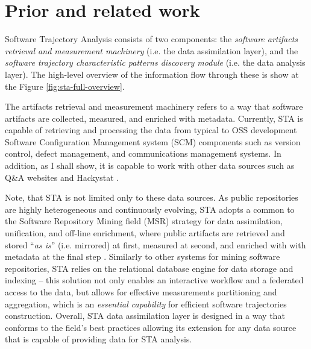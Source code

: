 \chapter{Prior and related work}\label{chapter_background_work}
Software Trajectory Analysis consists of two components: 
the \textit{software artifacts retrieval and measurement machinery} (i.e. the data assimilation layer), 
and the \textit{software trajectory characteristic patterns discovery module} (i.e. the data analysis layer). 
The high-level overview of the information flow through these is show at the Figure \ref{fig:sta-full-overview}.

The artifacts retrieval and measurement machinery refers to a way that software artifacts are collected, 
measured, and enriched with metadata. 
Currently, STA is capable of retrieving and processing the data from typical to OSS development Software 
Configuration Management system (SCM) components such as version control, 
defect management, and communications management systems. 
In addition, as I shall show, it is capable to work with other data sources such as Q\&A 
websites and Hackystat \cite{csdl2-10-09}.

Note, that STA is not limited only to these data sources.
As public repositories are highly heterogeneous and continuously evolving, STA adopts a common to the 
Software Repository Mining field (MSR) strategy for data assimilation, unification, and off-line enrichment,
where public artifacts are retrieved and stored ``\textit{as is}'' (i.e. mirrored) at first, 
measured at second, and enriched with with metadata at the final step 
\cite{citeulike:12550438} \cite{german04_softchange} \cite{cvsanaly}.
Similarly to other systems for mining software repositories, STA relies on the relational database engine 
for data storage and indexing -- this solution not only enables an interactive workflow and a federated 
access to the data, but allows for effective measurements partitioning and aggregation, which is 
an \textit{essential capability} for efficient software trajectories construction.
Overall, STA data assimilation layer is designed in a way that conforms to the field's best practices
allowing its extension for any data source that is capable of providing data for STA analysis.

